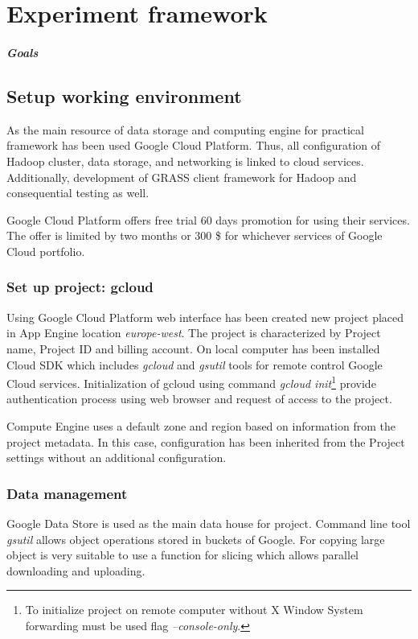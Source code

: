 \documentclass[a4paper,12pt,oneside]{report}
\begin{document}
\newpage
\chapter*{Experiment framework}
\paragraph{Goals}


\section{Setup working environment}
As the main resource of data storage and computing engine for practical framework has been used Google Cloud Platform.
 Thus, all configuration of Hadoop cluster, data storage, and networking is linked to cloud services. Additionally,
  development of GRASS client framework for Hadoop and consequential testing  as well.

Google Cloud Platform offers free trial 60 days promotion for using their services. The offer is limited by two
 months or 300 \$ for whichever services of Google Cloud portfolio.
        \subsection{Set up project: gcloud}
Using Google Cloud Platform web interface has been created new project placed in App Engine 
location \textit{europe-west}. The project is characterized by Project name, Project ID and billing account.
On local computer has been installed Cloud SDK which includes \textit{gcloud} 
and \textit{gsutil} tools for remote control Google Cloud services.
Initialization of gcloud using command \emph{gcloud init}\footnote{To initialize project on remote computer 
without X Window System forwarding must be used flag \emph{--console-only}.} provide authentication process using web browser 
and request of access to the project.

Compute Engine uses a default zone and region based on information from the project metadata. In this case, 
configuration has been inherited from the Project settings without an additional configuration.


\subsection{Data management}
        Google Data Store is used as the main data house for project. Command line tool \textit{gsutil} 
        allows object operations stored in buckets of Google. For copying large object is very suitable to use 
        a function for slicing which allows parallel 
        downloading and uploading.
        
\end{document}
